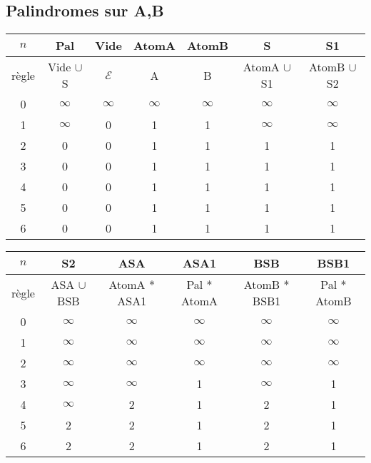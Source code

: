 \documentclass[a4paper, titlepage]{article}
\begin{document}
\newpage
\begin{table}[!hbt]
\subsection{Palindromes sur A,B}
\centering
\small
\setlength\tabcolsep{2pt}
\begin{tabular}{|c|cccccc|}
\hline $n$ & Pal & Vide & AtomA & AtomB & S & S1\\
\hline
\hline règle & Vide $\cup$ S & $\mathcal{E}$ & A & B & AtomA $\cup$ S1
& AtomB $\cup$ S2 \\
\hline
\hline
0 & $\infty$ &  $\infty$ & $\infty$ & $\infty$ & $\infty$ & $\infty$\\
1 & $\infty$ & 0 & 1 & 1 & $\infty$ & $\infty$\\
2 & 0 & 0 & 1 & 1 & 1 & 1\\
3 & 0 & 0 & 1 & 1 & 1 & 1\\
4 & 0 & 0 & 1 & 1 & 1 & 1\\
5 & 0 & 0 & 1 & 1 & 1 & 1\\
6 & 0 & 0 & 1 & 1 & 1 & 1\\

\hline
\end{tabular}

\vspace{1cm}

\begin{tabular}{|c|ccccc|}
\hline $n$ & S2 & ASA & ASA1 & BSB & BSB1  \\
\hline
\hline règle & ASA $\cup$ BSB & AtomA * ASA1 & Pal * AtomA &
AtomB * BSB1 & Pal * AtomB\\
\hline
\hline
0 & $\infty$ &  $\infty$ & $\infty$ & $\infty$ & $\infty$ \\
1 & $\infty$ &  $\infty$ & $\infty$ & $\infty$ & $\infty$ \\
2 & $\infty$ &  $\infty$ & $\infty$ & $\infty$ & $\infty$ \\
3 & $\infty$ &  $\infty$ & 1 & $\infty$ & 1 \\
4 & $\infty$ &  2 & 1 & 2 & 1 \\
5 & 2 &  2 & 1 & 2 & 1 \\
6 & 2 &  2 & 1 & 2 & 1 \\

\hline
\end{tabular}
\end{table}
\end{document}
